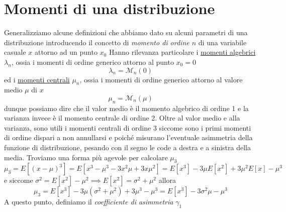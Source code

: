 \documentclass{report}
\begin{document}
\section{Momenti di una distribuzione}
Generalizziamo alcune definizioni che abbiamo dato su alcuni parametri di una distribuzione introducendo il concetto di \emph{momento di ordine $n$} di una variabile casuale $x$ attorno ad un punto $x_0$
\noindent Hanno rilevanza particolare i \underline{momenti algebrici} $\lambda_n$, ossia i momenti di ordine generico attorno al punto $x_0 = 0$
$$
	\lambda_n = \mathcal{M}_n(0)
$$
ed i \underline{momenti centrali} $\mu_n$, ossia i momenti di ordine generico attorno al valore medio $\mu$ di $x$
$$
	\mu_n = \mathcal{M}_n(\mu)
$$
dunque possiamo dire che il valor medio è il momento algebrico di ordine 1 e la varianza invece è il momento centrale di ordine 2. Oltre al valor medio e alla varianza, sono utili i momenti centrali di ordine 3 siccome sono i primi momenti di ordine dispari a non annullarsi e poiché misurano l'eventuale asimmetria della funzione di distribuzione, pesando con il segno le code a destra e a sinistra della media. Troviamo una forma più agevole per calcolare $\mu_3$
$$
	\mu_3 = E[(x-\mu)^3] = E [ x^3 - \mu^3 -3x^2 \mu + 3x \mu^2 ] = E[x^3] - 3\mu E[x^2] + 3\mu^2 E[x] - \mu^3
$$
e siccome $\sigma^2 = E[x^2] - \mu^2 \implies E[x^2] = \sigma^2 + \mu^2$ allora
\begin{equation}
	\mu_3 = E[x^3] - 3 \mu (\sigma^2 + \mu^2) + 3 \mu^3 - \mu^3 = E[x^3] - 3 \sigma^2 \mu - \mu^3
	\label{eq:mom_alg_terzo}
\end{equation}
A questo punto, definiamo il \emph{coefficiente di asimmetria} $\gamma_1$
\end{document}
